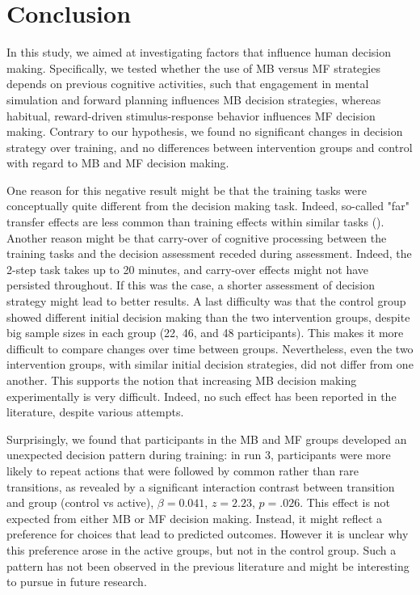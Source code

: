 \documentclass[11pt]{article} %
\begin{document}
\section{Conclusion}
In this study, we aimed at investigating factors that influence human decision making. Specifically, we tested whether the use of MB versus MF strategies depends on previous cognitive activities, such that engagement in mental simulation and forward planning influences MB decision strategies, whereas habitual, reward-driven stimulus-response behavior influences MF decision making. Contrary to our hypothesis, we found no significant changes in decision strategy over training, and no differences between intervention groups and control with regard to MB and MF decision making.

One reason for this negative result might be that the training tasks were conceptually quite different from the decision making task. Indeed, so-called "far" transfer effects are less common than training effects within similar tasks (\cite{jaeggi_short-_2011}). Another reason might be that carry-over of cognitive processing between the training tasks and the decision assessment receded during assessment. Indeed, the 2-step task takes up to 20 minutes, and carry-over effects might not have persisted throughout. If this was the case, a shorter assessment of decision strategy might lead to better results. A last difficulty was that the control group showed different initial decision making than the two intervention groups, despite big sample sizes in each group (22, 46, and 48 participants). This makes it more difficult to compare changes over time between groups. Nevertheless, even the two intervention groups, with similar initial decision strategies, did not differ from one another. This supports the notion that increasing MB decision making experimentally is very difficult. Indeed, no such effect has been reported in the literature, despite various attempts.

Surprisingly, we found that participants in the MB and MF groups developed an unexpected decision pattern during training: in run 3, participants were more likely to repeat actions that were followed by common rather than rare transitions, as revealed by a significant interaction contrast between transition and group (control vs active), $\beta = 0.041$, $z = 2.23$, $p = .026$. This effect is not expected from either MB or MF decision making. Instead, it might reflect a preference for choices that lead to predicted outcomes. However it is unclear why this preference arose in the active groups, but not in the control group. Such a pattern has not been observed in the previous literature and might be interesting to pursue in future research.
\end{document}
